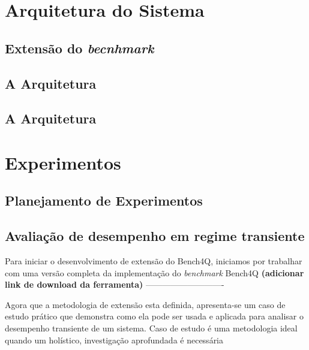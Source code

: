 \section{Arquitetura do Sistema}
\subsection{Extensão do  \textit{becnhmark}}
\subsection{A Arquitetura}
\subsection{A Arquitetura}

\section{Experimentos}
\subsection{Planejamento de Experimentos}
\subsection{Avaliação de desempenho em regime transiente}





Para iniciar o desenvolvimento de extensão do Bench4Q, iniciamos por trabalhar com uma versão completa da implementação do \textit{benchmark} Bench4Q \textbf{(adicionar link de download da ferramenta)}
----------------------------

Agora que a metodologia de extensão esta definida, apresenta-se um caso de estudo prático que demonstra como ela pode ser usada e aplicada para analisar o desempenho transiente de um sistema. Caso de estudo é uma metodologia ideal quando um holístico, investigação aprofundada é necessária %

